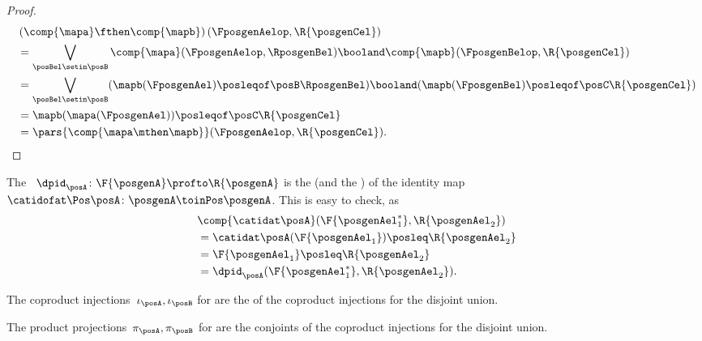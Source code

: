 \begin{proof}
\begin{equation}
        \begin{aligned}
            ~ & \left(\comp{\mapa}\fthen \comp{\mapb}\right)(\FposgenAelop,\R{\posgenCel}) \\
              & =\bigvee_{\posBel\setin \posB} \comp{\mapa}(\FposgenAelop,\RposgenBel)\booland\comp{\mapb}(\FposgenBelop,\R{\posgenCel}) \\%
              & =\bigvee_{\posBel\setin \posB} (\mapb(\FposgenAel)\posleqof\posB \RposgenBel)\booland (\mapb(\FposgenBel)\posleqof\posC \R{\posgenCel}) \\
              & =\mapb(\mapa(\FposgenAel))\posleqof\posC \R{\posgenCel} \\
              & =\pars{\comp{\mapa\mthen \mapb}}(\FposgenAelop,\R{\posgenCel}).
        \end{aligned}
    \end{equation}
\end{proof}

\begin{example}
    The ~$\dpid_\posA\colon \F{\posgenA} \profto \R{\posgenA}$ is the  (and the ) of the identity map~$\catidofat\Pos\posA \colon \posgenA \toinPos \posgenA$.
    This is easy to check, as
    \begin{equation}
        \begin{aligned}
            ~ & \comp{\catidat\posA}(\F{\posgenAel_1^*},\R{\posgenAel_2}) \\
              & =\catidat\posA(\F{\posgenAel_1})\posleq \R{\posgenAel_2} \\
              & =\F{\posgenAel_1}\posleq \R{\posgenAel_2} \\
              & =\dpid_\posA(\F{\posgenAel_1^*},\R{\posgenAel_2}).
        \end{aligned}
    \end{equation}
\end{example}

\begin{example}
    The coproduct injections~$\iota_\posA, \iota_\posB$ for  are the  of the coproduct injections for the disjoint union.
\end{example}

\begin{example}
    The product projections~$\pi_\posA, \pi_\posB$ for  are the conjoints of the coproduct injections for the disjoint union.
\end{example}

